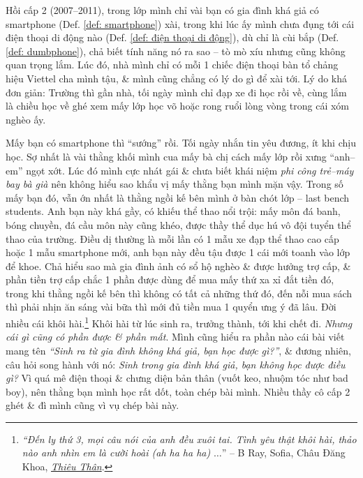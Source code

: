 \documentclass[12pt,oneside]{book}
\begin{document}
Hồi cấp 2 (2007--2011), trong lớp mình chỉ vài bạn có gia đình khá giả có smartphone (Def. \ref{def: smartphone}) xài, trong khi lúc ấy mình chưa đụng tới cái điện thoại di động nào (Def. \ref{def: điện thoại di động}), dù  chỉ là cùi bắp (Def. \ref{def: dumbphone}), chả biết tính năng nó ra sao -- tò mò xíu nhưng cũng không quan trọng lắm. Lúc đó, nhà mình chỉ có mỗi 1 chiếc điện thoại bàn tổ chảng hiệu Viettel cha mình tậu, \& mình cũng chẳng có lý do gì để xài tới. Lý do khá đơn giản: Trường thì gần nhà, tối ngày mình chỉ đạp xe đi học rồi về, cùng lắm là chiều học về ghé xem mấy lớp học võ hoặc rong ruổi lòng vòng trong cái xóm nghèo ấy.

Mấy bạn có smartphone thì ``sướng'' rồi. Tối ngày nhắn tin yêu đương, ít khi chịu học. Sợ nhất là vài thằng khối mình cua mấy bà chị cách mấy lớp rồi xưng ``anh--em'' ngọt xớt. Lúc đó mình cực nhát gái \& chưa biết khái niệm {\it phi công trẻ--máy bay bà già} nên không hiểu sao khẩu vị mấy thằng bạn mình mặn vậy. Trong số mấy bạn đó, vẫn ớn nhất là thằng ngồi kế bên mình ở bàn chót lớp -- last bench students. Anh bạn này khá gầy, có khiếu thể thao nổi trội: mấy môn đá banh, bóng chuyền, đá cầu môn này cũng khéo, được thầy thể dục hú vô đội tuyển thể thao của trường. Điều dị thường là mỗi lần có 1 mẫu xe đạp thể thao cao cấp hoặc 1 mẫu smartphone mới, anh bạn này đều tậu được 1 cái mới toanh vào lớp để khoe. Chả hiểu sao mà gia đình ảnh có sổ hộ nghèo \& được hưởng trợ cấp, \& phần tiền trợ cấp chắc 1 phần được dùng để mua mấy thứ xa xỉ đắt tiền đó, trong khi thằng ngồi kế bên thì không có tất cả những thứ đó, đến nỗi mua sách thì phải nhịn ăn sáng vài bữa thì mới đủ tiền mua 1 quyển ưng ý đã lâu. Đời nhiều cái khôi hài.\footnote{{\it``Đến ly thứ 3, mọi câu nói của anh đều xuôi tai. Tình yêu thật khôi hài, thảo nào anh nhìn em là cười hoài (ah ha ha ha)} $\ldots$'' -- B Ray, Sofia, Châu Đăng Khoa, \href{https://www.youtube.com/watch?v=cfbNtHNCMBo}{{\it Thiêu Thân}}.} Khôi hài từ lúc sinh ra, trưởng thành, tới khi chết đi. {\it Nhưng cái gì cũng có phần được \& phần mất}. Mình cũng hiểu ra phần nào cái bài viết mang tên {\it``Sinh ra từ gia đình không khá giả, bạn học được gì?''}, \& đương nhiên, câu hỏi song hành với nó: {\it Sinh trong gia đình khá giả, bạn không học được điều gì?} Vì quá mê điện thoại \& chưng diện bản thân (vuốt keo, nhuộm tóc như bad boy), nên thằng bạn mình học rất dốt, toàn chép bài mình. Nhiều thầy cô cấp 2 ghét \& đì mình cũng vì vụ chép bài này.
\end{document}
